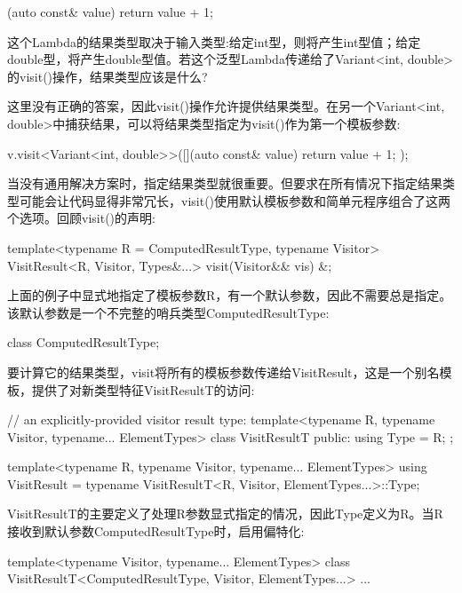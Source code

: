 \begin{cpp}
[](auto const& value) {
	return value + 1;
}
\end{cpp}

这个Lambda的结果类型取决于输入类型:给定int型，则将产生int型值；给定double型，将产生double型值。若这个泛型Lambda传递给了Variant<int, double>的visit()操作，结果类型应该是什么?

这里没有正确的答案，因此visit()操作允许提供结果类型。在另一个Variant<int, double>中捕获结果，可以将结果类型指定为visit()作为第一个模板参数:

\begin{cpp}
v.visit<Variant<int, double>>([](auto const& value) {
								return value + 1;
							});
\end{cpp}

当没有通用解决方案时，指定结果类型就很重要。但要求在所有情况下指定结果类型可能会让代码显得非常冗长，visit()使用默认模板参数和简单元程序组合了这两个选项。回顾visit()的声明:

\begin{cpp}
template<typename R = ComputedResultType, typename Visitor>
VisitResult<R, Visitor, Types&...> visit(Visitor&& vis) &;
\end{cpp}

上面的例子中显式地指定了模板参数R，有一个默认参数，因此不需要总是指定。该默认参数是一个不完整的哨兵类型ComputedResultType:

\begin{cpp}
class ComputedResultType;
\end{cpp}

要计算它的结果类型，visit将所有的模板参数传递给VisitResult，这是一个别名模板，提供了对新类型特征VisitResultT的访问:

\begin{cpp}
// an explicitly-provided visitor result type:
template<typename R, typename Visitor, typename... ElementTypes>
class VisitResultT
{
	public:
	using Type = R;
};

template<typename R, typename Visitor, typename... ElementTypes>
using VisitResult =
typename VisitResultT<R, Visitor, ElementTypes...>::Type;
\end{cpp}

VisitResultT的主要定义了处理R参数显式指定的情况，因此Type定义为R。当R接收到默认参数ComputedResultType时，启用偏特化:

\begin{cpp}
template<typename Visitor, typename... ElementTypes>
class VisitResultT<ComputedResultType, Visitor, ElementTypes...>
{
	...
}
\end{cpp}

